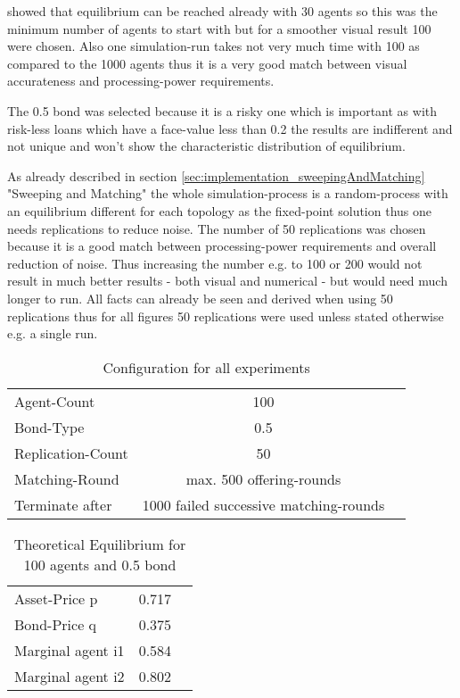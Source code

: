 \documentclass[Bachelorarbeit.tex]{subfiles}
\begin{document}
\bigskip 

\cite{Breuer2015} showed that equilibrium can be reached already with 30 agents so this was the minimum number of agents to start with but for a smoother visual result 100 were chosen. Also one simulation-run takes not very much time with 100 as compared to the 1000 agents thus it is a very good match between visual accurateness and processing-power requirements.

\medskip

The 0.5 bond was selected because it is a risky one which is important as with risk-less loans which have a face-value less than 0.2 the results are indifferent and not unique and won't show the characteristic distribution of equilibrium.

\medskip

As already described in section \ref{sec:implementation_sweepingAndMatching} "Sweeping and Matching" the whole simulation-process is a random-process with an equilibrium different for each topology as the fixed-point solution thus one needs replications to reduce noise. The number of 50 replications was chosen because it is a good match between processing-power requirements and overall reduction of noise. Thus increasing the number e.g. to 100 or 200 would not result in much better results - both visual and numerical - but would need much longer to run. All facts can already be seen and derived when using 50 replications thus for all figures 50 replications were used unless stated otherwise e.g. a single run.

\begin{table}[H]
	\centering
	\caption{Configuration for all experiments}
	\begin{tabular} { l c r }
		\hline
		Agent-Count & 100 \\
		Bond-Type & 0.5 \\
		Replication-Count & 50 \\
		Matching-Round & max. 500 offering-rounds \\
		Terminate after & 1000 failed successive matching-rounds \\
		\hline
	\end{tabular}
\end{table}

\begin{table}[H]
	\centering
	\caption{Theoretical Equilibrium for 100 agents and 0.5 bond}
	\begin{tabular} { l c r }
		\hline
		Asset-Price p & 0.717 \\
		Bond-Price q & 0.375 \\
		Marginal agent i1 & 0.584 \\
		Marginal agent i2 & 0.802 \\
		\hline
	\end{tabular}
	\label{tab:theoretical_equilibrium_100Agents_05Bond}
\end{table}
\end{document}
